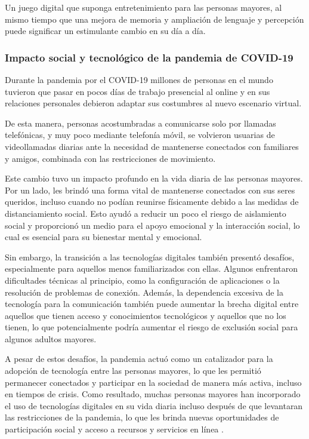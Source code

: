 Un juego digital que suponga entretenimiento para las personas mayores, al mismo tiempo que una mejora de memoria y ampliación de lenguaje y percepción puede significar un estimulante cambio en su día a día. 

\subsubsection{Impacto social y tecnológico de la pandemia de COVID-19}

Durante la pandemia por el COVID-19 millones de personas en el mundo tuvieron que pasar en pocos días de trabajo presencial al online y en sus relaciones personales debieron adaptar sus costumbres al nuevo escenario virtual.

De esta manera, personas acostumbradas a comunicarse solo por llamadas telefónicas, y muy poco mediante telefonía móvil, se volvieron usuarias de videollamadas diarias ante la necesidad de mantenerse conectados con familiares y amigos, combinada con las restricciones de movimiento.

Este cambio tuvo un impacto profundo en la vida diaria de las personas mayores. Por un lado, les brindó una forma vital de mantenerse conectados con sus seres queridos, incluso cuando no podían reunirse físicamente debido a las medidas de distanciamiento social. Esto ayudó a reducir un poco el riesgo de aislamiento social y proporcionó un medio para el apoyo emocional y la interacción social, lo cual es esencial para su bienestar mental y emocional.

Sin embargo, la transición a las tecnologías digitales también presentó desafíos, especialmente para aquellos menos familiarizados con ellas. Algunos enfrentaron dificultades técnicas al principio, como la configuración de aplicaciones o la resolución de problemas de conexión. Además, la dependencia excesiva de la tecnología para la comunicación también puede aumentar la brecha digital entre aquellos que tienen acceso y conocimientos tecnológicos y aquellos que no los tienen, lo que potencialmente podría aumentar el riesgo de exclusión social para algunos adultos mayores.

A pesar de estos desafíos, la pandemia actuó como un catalizador para la adopción de tecnología entre las personas mayores, lo que les permitió permanecer conectados y participar en la sociedad de manera más activa, incluso en tiempos de crisis. Como resultado, muchas personas mayores han incorporado el uso de tecnologías digitales en su vida diaria incluso después de que levantaran las restricciones de la pandemia, lo que les brinda nuevas oportunidades de participación social y acceso a recursos y servicios en línea \parencite{intro2}.

